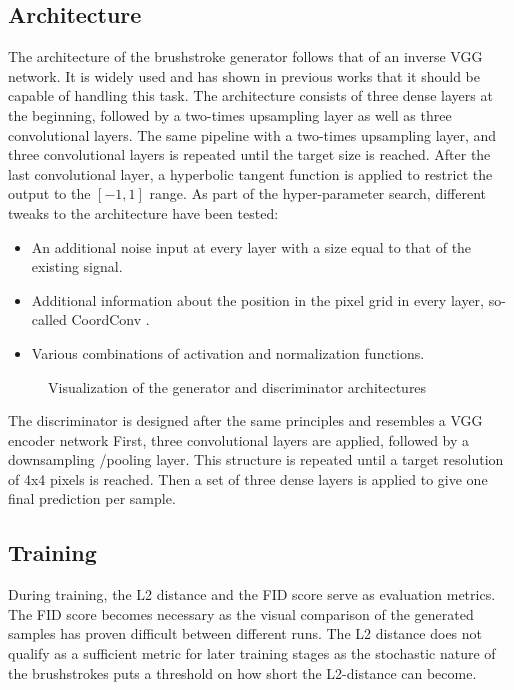 \subsection{Architecture}
The architecture of the brushstroke generator follows that of an inverse VGG network.
It is widely used and has shown in previous works that it should be capable of handling this task.
 The architecture consists of three dense layers at the beginning, followed by a two-times upsampling layer as well as three convolutional layers.
The same pipeline with a two-times upsampling layer, and three convolutional layers is repeated until the target size is reached.
After the last convolutional layer, a hyperbolic tangent function is applied to restrict the output to the $[-1, 1]$ range.
As part of the hyper-parameter search, different tweaks to the architecture have been tested:
\begin{itemize}
    \item An additional noise input at every layer with a size equal to that of the existing signal.
    \item Additional information about the position in the pixel grid in every layer, so-called CoordConv \cite{coordconv}.
    \item Various combinations of activation and normalization functions.
\end{itemize}

\begin{figure}
    \resizebox{1.5\textwidth}{!}{
        
    }
    \resizebox{1.5\textwidth}{!}{
        
    }
        \caption{Visualization of the generator and discriminator architectures}
\end{figure}

The discriminator is designed after the same principles and resembles a VGG encoder network
First, three convolutional layers are applied, followed by a downsampling /pooling layer.
This structure is repeated until a target resolution of 4x4 pixels is reached.
Then a set of three dense layers is applied to give one final prediction per sample.

\subsection{Training}
During training, the L2 distance and the FID score serve as evaluation metrics.
The FID score becomes necessary as the visual comparison of the generated samples has proven difficult between different runs.
The L2 distance does not qualify as a sufficient metric for later training stages as the stochastic nature of the brushstrokes puts a threshold on how short the L2-distance can become.

